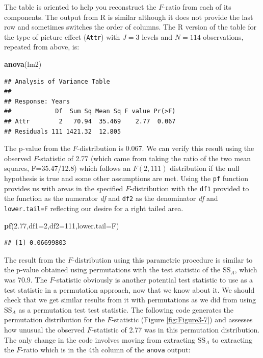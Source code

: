 \documentclass[]{book}
\newenvironment{Shaded}{\begin{snugshade}}{\end{snugshade}}
\newcommand{\KeywordTok}[1]{\textcolor[rgb]{0.13,0.29,0.53}{\textbf{#1}}}
\newcommand{\DataTypeTok}[1]{\textcolor[rgb]{0.13,0.29,0.53}{#1}}
\newcommand{\DecValTok}[1]{\textcolor[rgb]{0.00,0.00,0.81}{#1}}
\newcommand{\FloatTok}[1]{\textcolor[rgb]{0.00,0.00,0.81}{#1}}
\newcommand{\NormalTok}[1]{#1}
\theoremstyle{definition}
\theoremstyle{definition}
\theoremstyle{remark}
\begin{document}
The table is oriented to help you reconstruct the \(F\)-ratio from each
of its components. The output from R is similar although it does not
provide the last row and sometimes switches the order of columns. The R
version of the table for the type of picture effect (\texttt{Attr}) with
\(J=3\) levels and \(N=114\) observations, repeated from above, is:

\begin{Shaded}
\begin{Highlighting}[]
\KeywordTok{anova}\NormalTok{(lm2)}
\end{Highlighting}
\end{Shaded}

\begin{verbatim}
## Analysis of Variance Table
## 
## Response: Years
##            Df  Sum Sq Mean Sq F value Pr(>F)
## Attr        2   70.94  35.469    2.77  0.067
## Residuals 111 1421.32  12.805
\end{verbatim}

The p-value from the \(F\)-distribution is 0.067. We can verify this
result using the observed \(F\)-statistic of 2.77 (which came from
taking the ratio of the two mean squares, F=35.47/12.8) which follows an
\(F(2, 111)\) distribution if the null hypothesis is true and some other
assumptions are met. Using the \texttt{pf} function provides us with
areas in the specified \(F\)-distribution with the \texttt{df1} provided
to the function as the numerator \emph{df} and \texttt{df2} as the
denominator \emph{df} and \texttt{lower.tail=F} reflecting our desire
for a right tailed area.

\begin{Shaded}
\begin{Highlighting}[]
\KeywordTok{pf}\NormalTok{(}\FloatTok{2.77}\NormalTok{,}\DataTypeTok{df1=}\DecValTok{2}\NormalTok{,}\DataTypeTok{df2=}\DecValTok{111}\NormalTok{,}\DataTypeTok{lower.tail=}\NormalTok{F)}
\end{Highlighting}
\end{Shaded}

\begin{verbatim}
## [1] 0.06699803
\end{verbatim}

The result from the \(F\)-distribution using this parametric procedure
is similar to the p-value obtained using permutations with the test
statistic of the \(\text{SS}_A\), which was 70.9. The \(F\)-statistic
obviously is another potential test statistic to use as a test statistic
in a permutation approach, now that we know about it. We should check
that we get similar results from it with permutations as we did from
using \(\text{SS}_A\) as a permutation test test statistic. The
following code generates the permutation distribution for the
\(F\)-statistic (Figure \ref{fig:Figure3-7}) and assesses how unusual
the observed \(F\)-statistic of 2.77 was in this permutation
distribution. The only change in the code involves moving from
extracting \(\text{SS}_A\) to extracting the \(F\)-ratio which is in the
4th column of the \texttt{anova} output:
\end{document}
